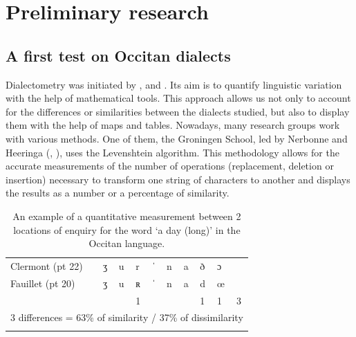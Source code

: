 \documentclass[output=paper]{LSP/langsci}
\begin{document}
\section{Preliminary research}

\subsection[A first test on Occitan dialects]{A first test on Occitan dialects}

Dialectometry was initiated by \citet{seguy_relation_1971,seguy_dialectometrie_1973}, and \citet{guiter_atlas_1973}. Its aim is to quantify linguistic variation with the help of mathematical tools. This approach allows us not only to account for the differences or similarities between the dialects studied, but also to display them with the help of maps and tables. Nowadays, many research groups work with various methods. One of them, the Groningen School, led by Nerbonne and Heeringa (\citealt{nerbonne_computational_2001,nerbonne_measuring_2010}, \citealt{heeringa_measuring_2004}), uses the Levenshtein algorithm. This methodology allows for the accurate measurements of the number of operations (replacement, deletion or insertion) necessary to transform one string of characters to another and displays the results as a number or a percentage of similarity.

\begin{table}
\begin{tabular}{llllllllll}
\lsptoprule
Clermont (pt 22) & ʒ & u & r & ˈ & n & a & ð & ɔ & \\
Fauillet (pt 20) & ʒ & u & ʀ & ˈ & n & a & d & œ & \\
&  &  & 1 &  &  &  & 1 & 1 & 3\\
\multicolumn{10}{l}{ 3 differences = 63\% of similarity / 37\% of dissimilarity}\\
\lspbottomrule
\end{tabular}
\caption{An example of a quantitative measurement between 2 locations of enquiry for the word ‘a day (long)’ in the Occitan language.}
\end{table}
\end{document}
